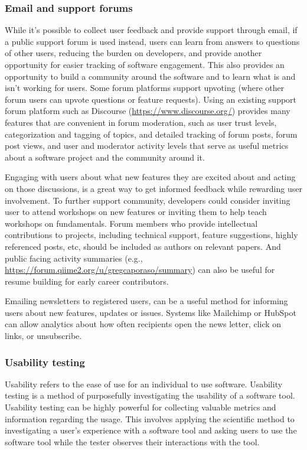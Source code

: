 \documentclass{article}
\begin{document}
\subsubsection{Email and support forums}
While it’s possible to collect user feedback and provide support through email,  if a public support forum is used instead, users can learn from answers to questions of other users, reducing the burden on developers, and provide another opportunity for easier tracking of software engagement. This also provides an opportunity to build a community around the software and to learn what is and isn’t working for users. Some forum platforms support upvoting (where other forum users can upvote questions or feature requests). Using an existing support forum platform such as Discourse (\url{https://www.discourse.org/}) provides many features that are convenient in forum moderation, such as user trust levels, categorization and tagging of topics, and detailed tracking of forum posts, forum post views, and user and moderator activity levels that serve as useful metrics about a software project and the community around it.

Engaging with users about what new features they are excited about and acting on those discussions, is a great way to get informed feedback while rewarding user involvement. To further support community, developers could consider inviting user to attend workshops on new features or inviting them to help teach workshops on fundamentals.  Forum members who provide intellectual contributions to projects, including technical support, feature suggestions, highly referenced posts, etc, should be included as authors on relevant papers. And public facing activity summaries (e.g., \url{https://forum.qiime2.org/u/gregcaporaso/summary}) can also be useful for resume building for early career contributors.

Emailing newsletters to registered users, can be a useful method for informing users about new features, updates or issues. Systems like Mailchimp \cite{mailchimp} or HubSpot \cite{hubspot} can allow analytics about how often recipients open the news letter, click on links, or unsubscribe.

\subsubsection{Usability testing}

Usability refers to the ease of use for an individual to use software. Usability testing is a method of purposefully investigating the usability of a software tool. Usability testing can be highly powerful for collecting valuable metrics and information regarding the usage. This involves applying the scientific method to investigating a user's experience with a software tool and asking users to use the software tool while the tester observes their interactions with the tool. 
\end{document}
